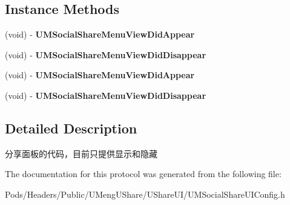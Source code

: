 \subsection*{Instance Methods}
\begin{DoxyCompactItemize}
\item 
\mbox{\label{protocol_u_m_social_share_menu_view_delegate_01-p_a15b43c29f0d6361085e6495356119a79}} 
(void) -\/ {\bfseries U\+M\+Social\+Share\+Menu\+View\+Did\+Appear}
\item 
\mbox{\label{protocol_u_m_social_share_menu_view_delegate_01-p_a91e8caeb66fdcd12a30afa227eccd213}} 
(void) -\/ {\bfseries U\+M\+Social\+Share\+Menu\+View\+Did\+Disappear}
\item 
\mbox{\label{protocol_u_m_social_share_menu_view_delegate_01-p_a15b43c29f0d6361085e6495356119a79}} 
(void) -\/ {\bfseries U\+M\+Social\+Share\+Menu\+View\+Did\+Appear}
\item 
\mbox{\label{protocol_u_m_social_share_menu_view_delegate_01-p_a91e8caeb66fdcd12a30afa227eccd213}} 
(void) -\/ {\bfseries U\+M\+Social\+Share\+Menu\+View\+Did\+Disappear}
\end{DoxyCompactItemize}


\subsection{Detailed Description}
分享面板的代码，目前只提供显示和隐藏 

The documentation for this protocol was generated from the following file\+:\begin{DoxyCompactItemize}
\item 
Pods/\+Headers/\+Public/\+U\+Meng\+U\+Share/\+U\+Share\+U\+I/U\+M\+Social\+Share\+U\+I\+Config.\+h\end{DoxyCompactItemize}

